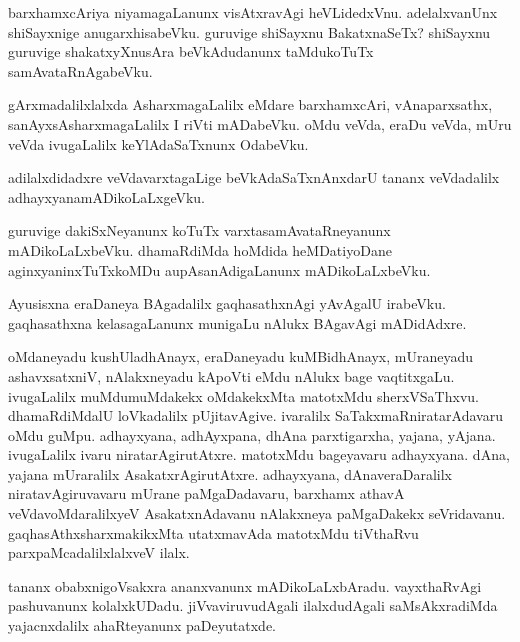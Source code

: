 \documentclass{article}
\begin{document}
\begin{mn}%
barxhamxcAriya niyamagaLanunx visAtxravAgi heVLidedxVnu. adelalxvanUnx
shiSayxnige anugarxhisabeVku. guruvige shiSayxnu BakatxnaSeTx?
shiSayxnu guruvige shakatxyXnusAra beVkAdudanunx taMdukoTuTx samAvataRnAgabeVku.
\end{mn}

\begin{mn}
gArxmadalilxlalxda AsharxmagaLalilx eMdare barxhamxcAri,
vAnaparxsathx, sanAyxsAsharxmagaLalilx I riVti mADabeVku. oMdu veVda,
eraDu veVda, mUru veVda ivugaLalilx keYlAdaSaTxnunx OdabeVku.
\end{mn}

\begin{mn}
adilalxdidadxre veVdavarxtagaLige beVkAdaSaTxnAnxdarU tananx
veVdadalilx adhayxyanamADikoLaLxgeVku.
\end{mn}

\begin{mn}
guruvige dakiSxNeyanunx koTuTx varxtasamAvataRneyanunx
mADikoLaLxbeVku. dhamaRdiMda hoMdida heMDatiyoDane
aginxyaninxTuTxkoMDu aupAsanAdigaLanunx mADikoLaLxbeVku.
\end{mn}

\begin{mn}
Ayusisxna eraDaneya BAgadalilx gaqhasathxnAgi yAvAgalU
irabeVku. gaqhasathxna kelasagaLanunx munigaLu nAlukx BAgavAgi mADidAdxre.
\end{mn}

\begin{mn}%
oMdaneyadu kushUladhAnayx, eraDaneyadu kuMBidhAnayx, mUraneyadu
ashavxsatxniV, nAlakxneyadu kApoVti eMdu nAlukx bage
vaqtitxgaLu. ivugaLalilx muMdumuMdakekx oMdakekxMta matotxMdu
sherxVSaThxvu. dhamaRdiMdalU loVkadalilx pUjitavAgive. ivaralilx
SaTakxmaRniratarAdavaru oMdu guMpu. adhayxyana, adhAyxpana, dhAna
parxtigarxha, yajana, yAjana. ivugaLalilx ivaru
niratarAgirutAtxre. matotxMdu bageyavaru adhayxyana. dAna, yajana
mUraralilx AsakatxrAgirutAtxre. adhayxyana, dAnaveraDaralilx
niratavAgiruvavaru mUrane paMgaDadavaru, barxhamx athavA
veVdavoMdaralilxyeV AsakatxnAdavanu nAlakxneya paMgaDakekx
seVridavanu. gaqhasAthxsharxmakikxMta utatxmavAda matotxMdu tiVthaRvu
parxpaMcadalilxlalxveV ilalx.
\end{mn}

\begin{mn}
tananx obabxnigoVsakxra ananxvanunx mADikoLaLxbAradu. vayxthaRvAgi
pashuvanunx kolalxkUDadu. jiVvaviruvudAgali ilalxdudAgali
saMsAkxradiMda yajacnxdalilx ahaRteyanunx paDeyutatxde.
\end{mn}
\end{document}
